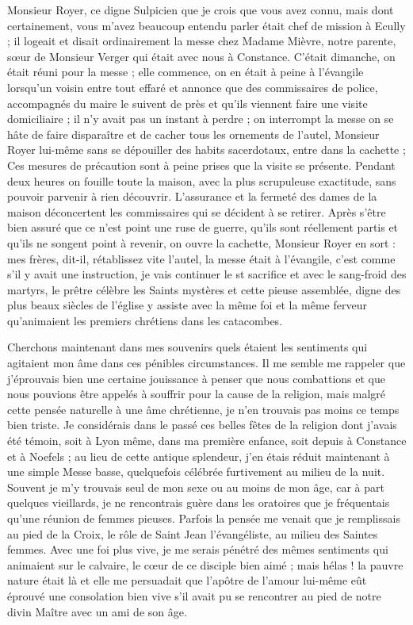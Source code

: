 \documentclass[11pt,a4paper]{report}
\begin{document}
Monsieur Royer, ce digne Sulpicien que je crois que vous avez connu, mais dont certainement, vous m'avez beaucoup entendu parler était chef de mission à Ecully ; il logeait et disait ordinairement la messe chez Madame Mièvre, notre parente, sœur de Monsieur Verger qui était avec nous à Constance. C'était dimanche, on était réuni pour la messe ; elle commence, on en était à peine à l'évangile lorsqu'un voisin entre tout effaré et annonce que des commissaires de police, accompagnés du maire le suivent de près et qu'ils viennent faire une visite domiciliaire ; il n'y avait pas un instant à perdre ; on interrompt la messe on se hâte de faire disparaître et de cacher tous les ornements de l'autel, Monsieur Royer lui-même sans se dépouiller des habits sacerdotaux, entre dans la cachette ; Ces mesures de précaution sont à peine prises que la visite se présente. Pendant deux heures on fouille toute la maison, avec la plus scrupuleuse exactitude, sans pouvoir parvenir à rien découvrir. L'assurance et la fermeté des dames de la maison déconcertent les commissaires qui se décident à se retirer. Après s'être bien assuré que ce n'est point une ruse de guerre, qu'ils sont réellement partis et qu'ils ne songent point à revenir, on ouvre la cachette, Monsieur Royer en sort : mes frères, dit-il, rétablissez vite l'autel, la messe était à l'évangile, c'est comme s'il y avait une instruction, je vais continuer le st sacrifice et avec le sang-froid des martyrs, le prêtre célèbre les Saints mystères et cette pieuse assemblée, digne des plus beaux siècles de l'église y assiste avec la même foi et la même ferveur qu'animaient les premiers chrétiens dans les catacombes.

\vspace{0.3cm}\hrulefill\vspace{0.3cm}

Cherchons maintenant dans mes souvenirs quels étaient les sentiments qui agitaient mon âme dans ces pénibles circumstances. Il me semble me rappeler que j'éprouvais bien une certaine jouissance à penser que nous combattions et que nous pouvions être appelés à souffrir pour la cause de la religion, mais malgré cette pensée naturelle à une âme chrétienne, je n'en trouvais pas moins ce temps bien triste. Je considérais dans le passé ces belles fêtes de la religion dont j'avais été témoin, soit à Lyon même, dans ma première enfance, soit depuis à Constance et à Noefels ; au lieu de cette antique splendeur, j'en étais réduit maintenant à une simple Messe basse, quelquefois célébrée furtivement au milieu de la nuit. Souvent je m'y trouvais seul de mon sexe ou au moins de mon âge, car à part quelques vieillards, je ne rencontrais guère dans les oratoires que je fréquentais qu'une réunion de femmes pieuses. Parfois la pensée me venait que je remplissais au pied de la Croix, le rôle de Saint Jean l'évangéliste, au milieu des Saintes femmes. Avec une foi plus vive, je me serais pénétré des mêmes sentiments qui animaient sur le calvaire, le cœur de ce disciple bien aimé ; mais hélas ! la pauvre nature était là et elle me persuadait que l'apôtre de l'amour lui-même eût éprouvé une consolation bien vive s'il avait pu se rencontrer au pied de notre divin Maître avec un ami de son âge.
\end{document}

